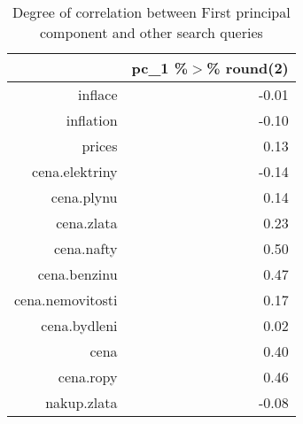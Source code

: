 \begin{table}[ht]
\centering
\begin{tabular}{rr}
  \hline
 & pc\_1 \%$>$\% round(2) \\ 
  \hline
inflace & -0.01 \\ 
  inflation & -0.10 \\ 
  prices & 0.13 \\ 
  cena.elektriny & -0.14 \\ 
  cena.plynu & 0.14 \\ 
  cena.zlata & 0.23 \\ 
  cena.nafty & 0.50 \\ 
  cena.benzinu & 0.47 \\ 
  cena.nemovitosti & 0.17 \\ 
  cena.bydleni & 0.02 \\ 
  cena & 0.40 \\ 
  cena.ropy & 0.46 \\ 
  nakup.zlata & -0.08 \\ 
   \hline
\end{tabular}
\caption{Degree of correlation between First principal component and other search queries} 
\end{table}
